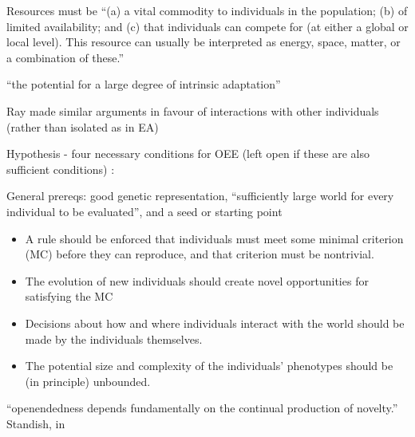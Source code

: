		Resources must be ``(a) a vital commodity to individuals in the
		population; (b) of limited availability; and (c) that individuals
		can compete for (at either a global or local level). This resource
		can usually be interpreted as energy, space, matter, or a
		combination of these.''

		``the potential for a large degree of intrinsic adaptation''
	
		Ray made similar arguments in favour of interactions with other individuals (rather than isolated as in EA) 		
	
	
Hypothesis - four necessary conditions for OEE (left open if these are also sufficient conditions) \autocite{Soros2014}:
			
General prereqs: good genetic representation, ``sufficiently large world for every individual to be evaluated'', and a seed or starting point
			
\begin{itemize}
	\item
	
	A rule should be enforced that individuals must meet some minimal
	criterion (MC) before they can reproduce, and that criterion must be
	nontrivial.
	
	\item
	
	The evolution of new individuals should create novel opportunities
	for satisfying the MC
	
	\item
	
	Decisions about how and where individuals interact with the world
	should be made by the individuals themselves.
	
	\item
	
	The potential size and complexity of the individuals' phenotypes
	should be (in principle) unbounded.
	
\end{itemize}

``openendedness depends fundamentally on the continual production of novelty.'' Standish, in \autocite{Soros2014}
	
